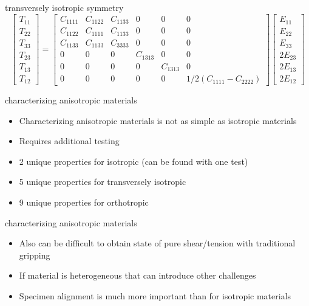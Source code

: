 \documentclass[
  letterpaper,
  ignorenonframetext,
  aspectratio=43,
  handout,
  12pt]{beamer}
\providecommand{\tightlist}{%
  \setlength{\itemsep}{0pt}\setlength{\parskip}{0pt}}
\providecommand{\tightlist}{%
\setlength{\itemsep}{0pt}\setlength{\parskip}{0pt}}
\begin{document}
\begin{frame}{transversely isotropic symmetry}
\protect\hypertarget{transversely-isotropic-symmetry-1}{}
\[\begin{bmatrix}
    T_{11} \\ T_{22} \\ T_{33} \\ T_{23} \\ T_{13} \\ T_{12}
\end{bmatrix}
= \begin{bmatrix}
    C_{1111} & C_{1122} & C_{1133} & 0 & 0 & 0 \\
    C_{1122} & C_{1111} & C_{1133} & 0 & 0 & 0 \\
    C_{1133} & C_{1133} & C_{3333} & 0 & 0 & 0 \\
    0 & 0 & 0 & C_{1313} & 0 & 0 \\
    0 & 0 & 0 & 0 & C_{1313} & 0 \\
    0 & 0 & 0 & 0 & 0 & 1/2(C_{1111}-C_{2222})
\end{bmatrix}\begin{bmatrix}
    E_{11} \\ E_{22} \\ E_{33} \\ 2E_{23} \\ 2E_{13} \\ 2E_{12}
\end{bmatrix}\]
\end{frame}

\begin{frame}{characterizing anisotropic materials}
\protect\hypertarget{characterizing-anisotropic-materials}{}
\begin{itemize}
\tightlist
\item
  Characterizing anisotropic materials is not as simple as isotropic
  materials
\item
  Requires additional testing
\item
  2 unique properties for isotropic (can be found with one test)
\item
  5 unique properties for transversely isotropic
\item
  9 unique properties for orthotropic
\end{itemize}
\end{frame}

\begin{frame}{characterizing anisotropic materials}
\protect\hypertarget{characterizing-anisotropic-materials-1}{}
\begin{itemize}
\tightlist
\item
  Also can be difficult to obtain state of pure shear/tension with
  traditional gripping
\item
  If material is heterogeneous that can introduce other challenges
\item
  Specimen alignment is much more important than for isotropic materials
\end{itemize}
\end{frame}
\end{document}
